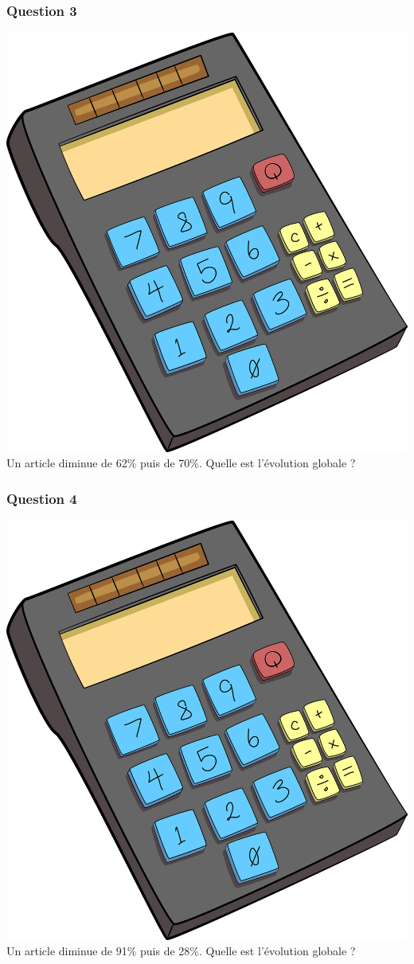 \documentclass[15pt, mathserif]{beamer}
\begin{document}
\begin{frame} 
	\frametitle{Question 3}
\includegraphics[scale=0.01]{calculatrice} Un article diminue de 62\% puis de 70\%. Quelle est l'évolution globale ?\end{frame}


\begin{frame} 
	\frametitle{Question 4}
\includegraphics[scale=0.01]{calculatrice} Un article diminue de 91\% puis de 28\%. Quelle est l'évolution globale ?\end{frame}
\end{document}

